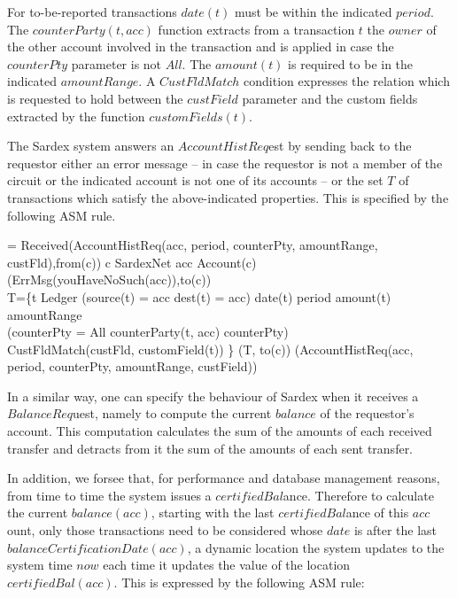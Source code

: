 For to-be-reported transactions $date(t)$ must be within the indicated $period$.  The $counterParty(t, acc)$ function extracts from a transaction $t$ the $owner$ of the other account involved in the transaction and is applied in case the $counterPty$ parameter is not $All$.  The $amount(t)$  is required to be in the indicated $amountRange$. A $CustFldMatch$ condition expresses the relation which is requested to hold between the $custField$ parameter and the custom fields extracted by the function $customFields(t)$. 



The Sardex system answers an $AccountHistReq$est by sending back to the requestor 
either an error message -- in case the requestor is not a member of the circuit or 
the indicated account is not one of its accounts -- or the set $T$ of transactions 
which satisfy the above-indicated properties. This is specified by the following ASM rule.

\begin{asm}
=\+
   \IF Received(AccountHistReq(acc, period, counterPty, amountRange, custFld),from(c))    \THEN \+
     \IF c \not \in SardexNet \OR acc \not\in Account(c) \+
       \THEN {}(ErrMsg(youHaveNoSuch(acc)),to(c))\\
       \ELSE \+
       \LET T=\{t \in Ledger \mid (source(t) = acc \OR dest(t) = acc) \+
           \AND date(t) \in period \AND amount(t) \in amountRange \\
           \AND (\IF counterPty \not = All \THEN 
               counterParty(t, acc) \in  counterPty)\\
           \AND CustFldMatch(custFld, customField(t)) \} \IN \+
                 (T, to(c))\dec\dec\dec\-
     (AccountHistReq(acc, period, counterPty, amountRange, custField))
\end{asm}

In a similar way, one can specify the behaviour of Sardex when it receives a $BalanceReq$uest, namely to compute the current $balance$ of the requestor's account. This computation calculates the sum of the amounts of each received transfer and detracts from it the sum of the amounts of each sent transfer.

In addition, we forsee that, for performance and database management reasons, from time to time the system issues a $certifiedBal$ance. Therefore to calculate the current $balance(acc)$, starting with the last $certifiedBal$ance of this $acc$ount, only those transactions need to be considered whose $date$ is after the last $balanceCertificationDate(acc)$, a dynamic location the system updates to the system time $now$ each time it updates the value of the location $certifiedBal(acc)$. This is expressed by the following ASM rule:

